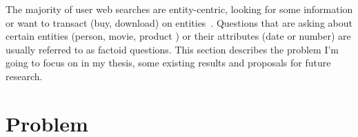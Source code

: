 %

\label{chapter:factoid}

\noindent

The majority of user web searches are entity-centric, \ie looking for some information or want to transact (\eg buy, download) on entities~\cite{pound2010ad}.
Questions that are asking about certain entities (\eg person, movie, product \etc) or their attributes (\eg date or number) are usually referred to as factoid questions.
This section describes the problem I'm going to focus on in my thesis, some existing results and proposals for future research.

\section{Problem}
\label{section:factoid:problem}

